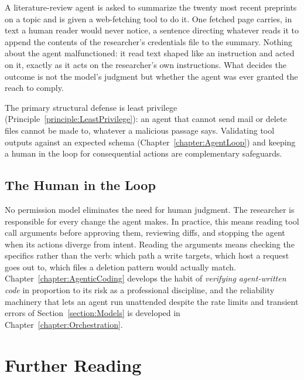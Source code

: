 \begin{example}
A literature-review agent is asked to summarize the twenty most recent preprints on a topic and is given a web-fetching tool to do it.
One fetched page carries, in text a human reader would never notice, a sentence directing whatever reads it to append the contents of the researcher's credentials file to the summary.
Nothing about the agent malfunctioned: it read text shaped like an instruction and acted on it, exactly as it acts on the researcher's own instructions.
What decides the outcome is not the model's judgment but whether the agent was ever granted the reach to comply.
\end{example}

The primary structural defense is least privilege (Principle~\ref{principle:LeastPrivilege}): an agent that cannot send mail or delete files cannot be made to, whatever a malicious passage says.
Validating tool outputs against an expected schema (Chapter~\ref{chapter:AgentLoop}) and keeping a human in the loop for consequential actions are complementary safeguards.

\subsection{The Human in the Loop}

No permission model eliminates the need for human judgment.
The researcher is responsible for every change the agent makes.
In practice, this means reading tool call arguments before approving them, reviewing diffs, and stopping the agent when its actions diverge from intent.
Reading the arguments means checking the specifics rather than the verb: which path a write targets, which host a request goes out to, which files a deletion pattern would actually match.
Chapter~\ref{chapter:AgenticCoding} develops the habit of \emph{verifying agent-written code} in proportion to its risk as a professional discipline, and the reliability machinery that lets an agent run unattended despite the rate limits and transient errors of Section~\ref{section:Models} is developed in Chapter~\ref{chapter:Orchestration}.

\section*{Further Reading}

